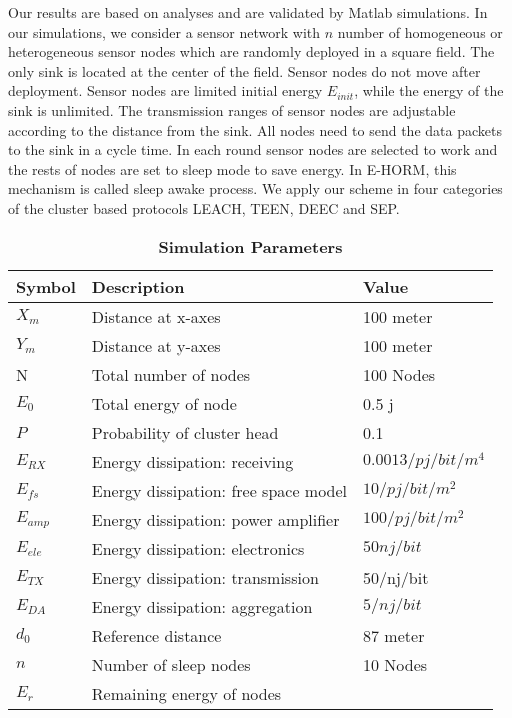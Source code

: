 \documentclass{article}
\begin{document}
Our results are based on analyses and are validated by Matlab simulations. In our simulations, we consider a sensor network with $n$ number of homogeneous or heterogeneous sensor nodes which are randomly deployed in a square field. The only sink is located at the center of the field. Sensor nodes do not move after deployment. Sensor nodes are limited initial energy $E_{init}$, while the energy of the sink is unlimited. The transmission ranges of sensor nodes are adjustable according to the distance from the sink. All nodes need to send the data packets to the sink in a cycle time. In each round sensor nodes are selected to work and the rests of nodes are set to sleep mode to save energy. In E-HORM, this mechanism is called sleep awake process. We apply our scheme in four categories of the cluster based protocols LEACH, TEEN, DEEC and SEP.\\ \begin{table}[h!]
  \centering
  \caption{\textbf{Simulation Parameters}}  \vspace{0.5cm}
  \tiny
  \begin{tabular}{|l|l|l|}\hline
  \textbf{Symbol} &\textbf{Description}   &\textbf{Value}\\ \hline
    $X_m$  & Distance at x-axes &100 meter \\ \hline
    $Y_m$  &Distance at y-axes  &100 meter\\ \hline
     N     &Total number of nodes & 100 Nodes \\ \hline
   $E_0$   &Total energy of node & 0.5 j \\ \hline
    $P$    &Probability of cluster head & 0.1 \\ \hline
    $E_{RX}$ &Energy dissipation: receiving & $0.0013/pj/bit/m^4$\\ \hline
    $E_{fs}$ &Energy dissipation: free space model & $10/pj/bit/m^2$\\ \hline
    $E_{amp}$&Energy dissipation: power amplifier & $100/pj/bit/m^2$ \\ \hline
    $E_{ele}$ &Energy dissipation: electronics   & $50nj/bit$ \\ \hline
    $E_{TX}$  &Energy dissipation: transmission   & 50/nj/bit \\ \hline
    $E_{DA}$  &Energy dissipation: aggregation    & $5/nj/bit$ \\ \hline
     $d_0$    &Reference distance                 & 87 meter  \\ \hline
  $n$        &Number of sleep nodes               & 10 Nodes\\ \hline
    $E_r$        &Remaining energy of nodes               & \\ \hline
    \end{tabular}\label{tab:addlabel}\end{table}
\end{document}
